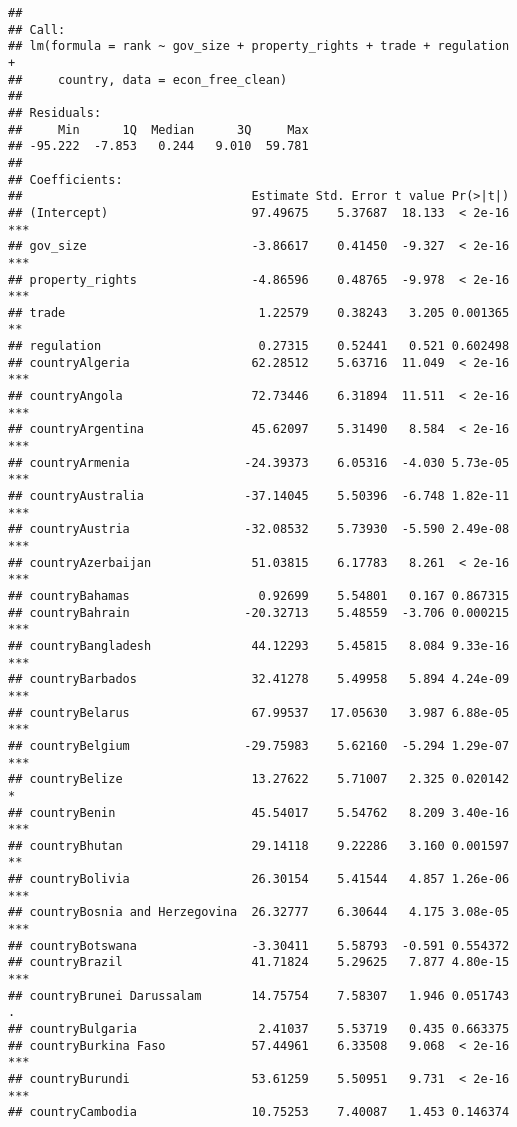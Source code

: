 \documentclass[
  11pt,
]{article}
\begin{document}
\begin{verbatim}
## 
## Call:
## lm(formula = rank ~ gov_size + property_rights + trade + regulation + 
##     country, data = econ_free_clean)
## 
## Residuals:
##     Min      1Q  Median      3Q     Max 
## -95.222  -7.853   0.244   9.010  59.781 
## 
## Coefficients:
##                                Estimate Std. Error t value Pr(>|t|)    
## (Intercept)                    97.49675    5.37687  18.133  < 2e-16 ***
## gov_size                       -3.86617    0.41450  -9.327  < 2e-16 ***
## property_rights                -4.86596    0.48765  -9.978  < 2e-16 ***
## trade                           1.22579    0.38243   3.205 0.001365 ** 
## regulation                      0.27315    0.52441   0.521 0.602498    
## countryAlgeria                 62.28512    5.63716  11.049  < 2e-16 ***
## countryAngola                  72.73446    6.31894  11.511  < 2e-16 ***
## countryArgentina               45.62097    5.31490   8.584  < 2e-16 ***
## countryArmenia                -24.39373    6.05316  -4.030 5.73e-05 ***
## countryAustralia              -37.14045    5.50396  -6.748 1.82e-11 ***
## countryAustria                -32.08532    5.73930  -5.590 2.49e-08 ***
## countryAzerbaijan              51.03815    6.17783   8.261  < 2e-16 ***
## countryBahamas                  0.92699    5.54801   0.167 0.867315    
## countryBahrain                -20.32713    5.48559  -3.706 0.000215 ***
## countryBangladesh              44.12293    5.45815   8.084 9.33e-16 ***
## countryBarbados                32.41278    5.49958   5.894 4.24e-09 ***
## countryBelarus                 67.99537   17.05630   3.987 6.88e-05 ***
## countryBelgium                -29.75983    5.62160  -5.294 1.29e-07 ***
## countryBelize                  13.27622    5.71007   2.325 0.020142 *  
## countryBenin                   45.54017    5.54762   8.209 3.40e-16 ***
## countryBhutan                  29.14118    9.22286   3.160 0.001597 ** 
## countryBolivia                 26.30154    5.41544   4.857 1.26e-06 ***
## countryBosnia and Herzegovina  26.32777    6.30644   4.175 3.08e-05 ***
## countryBotswana                -3.30411    5.58793  -0.591 0.554372    
## countryBrazil                  41.71824    5.29625   7.877 4.80e-15 ***
## countryBrunei Darussalam       14.75754    7.58307   1.946 0.051743 .  
## countryBulgaria                 2.41037    5.53719   0.435 0.663375    
## countryBurkina Faso            57.44961    6.33508   9.068  < 2e-16 ***
## countryBurundi                 53.61259    5.50951   9.731  < 2e-16 ***
## countryCambodia                10.75253    7.40087   1.453 0.146374    

\end{verbatim}
\end{document}
